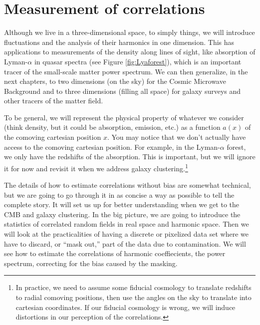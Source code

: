 \chapter{Measurement of correlations} \label{ch:correlations}

Although we live in a three-dimensional space, to simply things, we will introduce fluctuations and the analysis of their harmonics in one dimension.  This has applications to measurements of the density along lines of sight, like absorption of Lyman-$\alpha$ in quasar spectra (see Figure \ref{fig:Lyaforest}), which is an important tracer of the small-scale matter power spectrum.  We can then generalize, in the next chapters, to two dimensions (on the sky) for the Cosmic Microwave Background and to three dimensions (filling all space) for galaxy surveys and other tracers of the matter field.

To be general, we will represent the physical property of whatever we consider (think density, but it could be absorption, emission, etc.) as a function $a(x)$ of the comoving cartesian position $x$.  You may notice that we don't actually have access to the comoving cartesian position.  For example, in the Lyman-$\alpha$ forest, we only have the redshifts of the absorption.  This is  important, but we will ignore it for now and revisit it when we address galaxy clustering.\footnote{In practice, we need to assume some fiducial cosmology to translate redshifts to radial comoving positions, then use the angles on the sky to translate into cartesian coordinates.  If our fiducial cosmology is wrong, we will induce distortions in our perception of the correlations.} %

The details of how to estimate correlations without bias are somewhat technical, but we are going to go through it in as concise a way as possible to tell the complete story.  It will set us up for better understanding when we get to the CMB and galaxy clustering.  In the big picture, we are going to introduce the statistics of correlated random fields in real space and harmonic space.  Then we will look at the practicalities of having a discrete or pixelized data set where we have to discard, or ``mask out,'' part of the data due to contamination.  We will see how to estimate the correlations of harmonic coeffiecients, the power spectrum, correcting for the bias caused by the masking.

